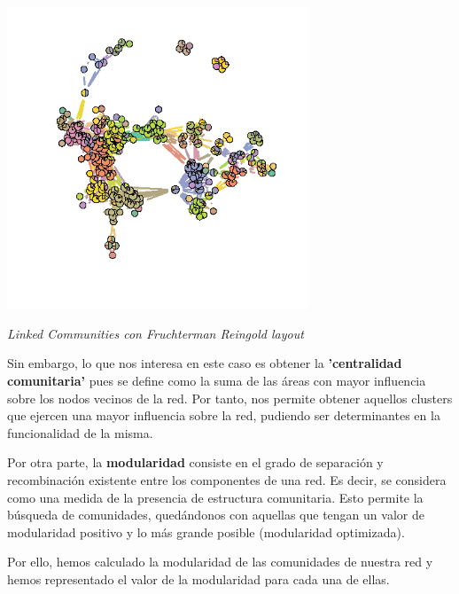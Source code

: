 \begin{center}

\includegraphics[width=90mm,scale=1]{report/figures/linkcomm_layout.fruchterman.reingold.png}


\caption{\textit{Linked Communities con Fruchterman Reingold layout }}

\end{center}

Sin embargo, lo que nos interesa en este caso es obtener la \textbf{'centralidad comunitaria'} pues se define como la suma de las áreas con mayor influencia sobre los nodos vecinos de la red. Por tanto, nos permite obtener aquellos clusters que ejercen una mayor influencia sobre la red, pudiendo ser determinantes en la funcionalidad de la misma.

Por otra parte, la \textbf{modularidad} consiste en el grado de separación y recombinación existente entre los componentes de una red. Es decir, se considera como una medida de la presencia de estructura comunitaria. Esto permite la búsqueda de comunidades, quedándonos con aquellas que tengan un valor de modularidad positivo y lo más grande posible (modularidad optimizada).

Por ello, hemos calculado la modularidad de las comunidades de nuestra red y hemos representado el valor de la modularidad para cada una de ellas.

